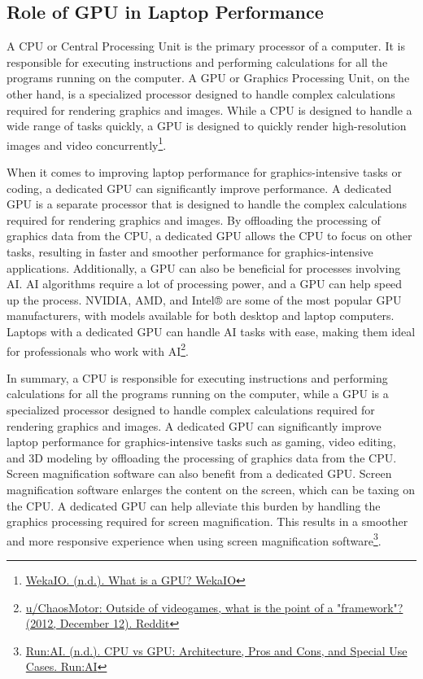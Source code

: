  \pagebreak \hypertarget{gpu-needs}{}\subsection{Role of GPU in Laptop Performance}\label{gpu-needs}
 A CPU or Central Processing Unit is the primary processor of a computer. It is responsible for executing instructions and performing calculations for all the programs running on the computer. A GPU or Graphics Processing Unit, on the other hand, is a specialized processor designed to handle complex calculations required for rendering graphics and images. While a CPU is designed to handle a wide range of tasks quickly, a GPU is designed to quickly render high-resolution images and video concurrently\footnote{\raggedright \href{https://www.weka.io/learn/gpu/what-is-a-gpu/}{WekaIO. (n.d.). What is a GPU? WekaIO}}.
 
 When it comes to improving laptop performance for graphics-intensive tasks or coding, a dedicated GPU can significantly improve performance. A dedicated GPU is a separate processor that is designed to handle the complex calculations required for rendering graphics and images. By offloading the processing of graphics data from the CPU, a dedicated GPU allows the CPU to focus on other tasks, resulting in faster and smoother performance for graphics-intensive applications. Additionally, a GPU can also be beneficial for processes involving AI. AI algorithms require a lot of processing power, and a GPU can help speed up the process. NVIDIA, AMD, and Intel® are some of the most popular GPU manufacturers, with models available for both desktop and laptop computers. Laptops with a dedicated GPU can handle AI tasks with ease, making them ideal for professionals who work with AI\footnote{\raggedright \href{https://www.reddit.com/r/framework/comments/14pb7b/outside_of_videogames_what_is_the_point_of_a/}{u/ChaosMotor: Outside of videogames, what is the point of a "framework"? (2012, December 12). Reddit}}.
 
 In summary, a CPU is responsible for executing instructions and performing calculations for all the programs running on the computer, while a GPU is a specialized processor designed to handle complex calculations required for rendering graphics and images\footnotemark[52]. A dedicated GPU can significantly improve laptop performance for graphics-intensive tasks such as gaming, video editing, and 3D modeling by offloading the processing of graphics data from the CPU. Screen magnification software can also benefit from a dedicated GPU. Screen magnification software enlarges the content on the screen, which can be taxing on the CPU. A dedicated GPU can help alleviate this burden by handling the graphics processing required for screen magnification. This results in a smoother and more responsive experience when using screen magnification software\footnote{\raggedright \href{https://www.run.ai/guides/multi-gpu/cpu-vs-gpu}{Run:AI. (n.d.). CPU vs GPU: Architecture, Pros and Cons, and Special Use Cases. Run:AI}}.
 
